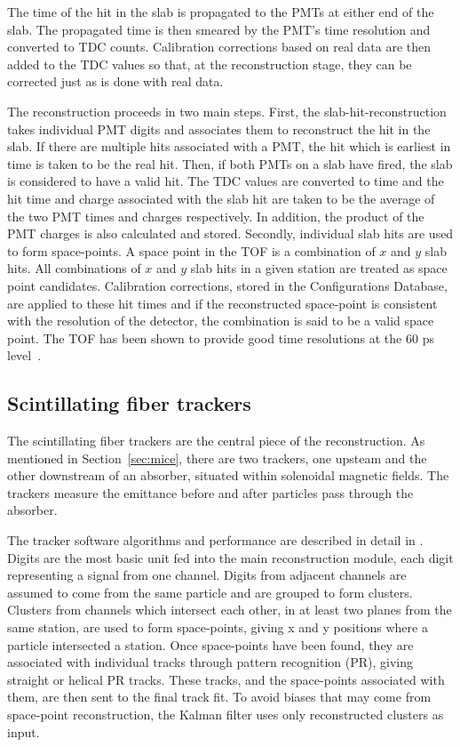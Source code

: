 \documentclass{JINST}
\begin{document}
The time of the hit in the slab is propagated to the PMTs at either end of the slab. The propagated time is then smeared by the PMT's time resolution and converted to TDC counts. Calibration corrections based on real data are then added to the TDC values so that, at the reconstruction stage, they can be corrected just as is done with real data.

The reconstruction proceeds in two main steps. First, the slab-hit-reconstruction takes individual PMT digits and associates them to reconstruct the hit in the slab. If there are multiple hits associated with a PMT, the hit which is earliest in time is taken to be the real hit. Then, if both PMTs on a slab have fired, the slab is considered to have a valid hit. The TDC values are converted to time and the hit time and charge associated with the slab hit are taken to be the average of the two PMT times and charges respectively. In addition, the product of the PMT charges is also calculated and stored. Secondly, individual slab hits are used to form space-points. A space point  in the TOF is a combination of $x$ and $y$ slab hits. All combinations of $x$ and $y$ slab hits in a given station are treated as space point candidates. Calibration corrections, stored in the Configurations Database, are applied to these hit times and if the reconstructed space-point is consistent with the resolution of the detector, the combination is said to be a valid space point. The TOF has been shown to provide good time resolutions at the 60 ps level~\cite{NIMA_TOF}.



\subsection{Scintillating fiber trackers}

The scintillating fiber trackers are the central piece of the reconstruction. As mentioned in Section~\ref{sec:mice}, there are two trackers, one upsteam and the other downstream of an absorber, situated within solenoidal magnetic fields. The trackers measure the emittance before and after particles pass through the absorber.

The tracker software algorithms and performance are described in detail in \cite{TrackerSoftwareJINST}. Digits are the most basic unit fed into the main reconstruction module, each digit representing a signal from one channel. Digits from adjacent channels are assumed to come from the same particle and are grouped to form clusters. Clusters from channels which intersect each other, in at least two planes from the same station, are used to form space-points, giving x and y positions where a particle intersected a station. Once space-points have been found, they are associated with individual tracks through pattern recognition (PR), giving straight or helical PR tracks. These tracks, and the space-points associated with them, are then sent to the final track fit. To avoid biases that may come from space-point reconstruction, the Kalman filter uses only reconstructed clusters as input.
\end{document}
